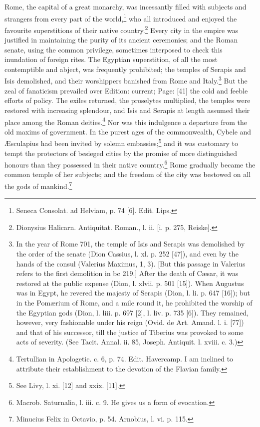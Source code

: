 Rome, the capital of a great monarchy, was incessantly filled with subjects and strangers from every part of the world,\footnote{Seneca Consolat. ad Helviam, p. 74 [6]. Edit. Lips.} who all introduced and enjoyed the favourite superstitions of their native country.\footnote{Dionysius Halicarn. Antiquitat. Roman., l. ii. [i. p. 275, Reiske].} Every city in the empire was justified in maintaining the purity of its ancient ceremonies; and the Roman senate, using the common privilege, sometimes interposed to check this inundation of foreign rites. The Egyptian superstition, of all the most contemptible and abject, was frequently prohibited; the temples of Serapis and Isis demolished, and their worshippers banished from Rome and Italy.\footnote{In the year of Rome 701, the temple of Isis and Serapis was demolished by the order of the senate (Dion Cassius, l. xl. p. 252 [47]), and even by the hands of the consul (Valerius Maximus, 1, 3). [But this passage in Valerius refers to the first demolition in bc 219.] After the death of Cæsar, it was restored at the public expense (Dion, l. xlvii. p. 501 [15]). When Augustus was in Egypt, he revered the majesty of Serapis (Dion, l. li. p. 647 [16]); but in the Pomærium of Rome, and a mile round it, he prohibited the worship of the Egyptian gods (Dion, l. liii. p. 697 [2], l. liv. p. 735 [6]). They remained, however, very fashionable under his reign (Ovid. de Art. Amand. l. i. [77]) and that of his successor, till the justice of Tiberius was provoked to some acts of severity. (See Tacit. Annal. ii. 85, Joseph. Antiquit. l. xviii. c. 3.)} But the zeal of fanaticism prevailed over Edition: current; Page: [41] the cold and feeble efforts of policy. The exiles returned, the proselytes multiplied, the temples were restored with increasing splendour, and Isis and Serapis at length assumed their place among the Roman deities.\footnote{Tertullian in Apologetic. c. 6, p. 74. Edit. Havercamp. I am inclined to attribute their establishment to the devotion of the Flavian family.} Nor was this indulgence a departure from the old maxims of government. In the purest ages of the commonwealth, Cybele and Æsculapius had been invited by solemn embassies;\footnote{See Livy, l. xi. [12] and xxix. [11].} and it was customary to tempt the protectors of besieged cities by the promise of more distinguished honours than they possessed in their native country.\footnote{Macrob. Saturnalia, l. iii. c. 9. He gives us a form of evocation.} Rome gradually became the common temple of her subjects; and the freedom of the city was bestowed on all the gods of mankind.\footnote{Minucius Felix in Octavio, p. 54. Arnobius, l. vi. p. 115.}

